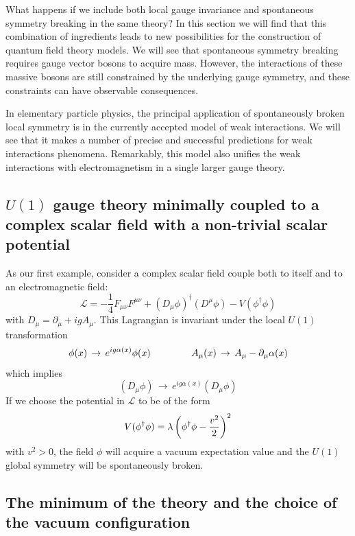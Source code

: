 \documentclass[TheoreticalPhy_ModB.tex]{subfiles}
\begin{document}
What happens if we include both local gauge invariance and spontaneous symmetry breaking in the same theory? In this section we will find that this combination of ingredients leads to new possibilities for the construction of quantum field theory models. We will see that spontaneous symmetry breaking requires gauge vector bosons to acquire mass. However, the interactions of these massive bosons are still constrained by the underlying gauge symmetry, and these constraints can have observable consequences. 

In elementary particle physics, the principal application of spontaneously broken local symmetry is in the currently accepted model of weak interactions. We will see that it makes a number of precise and successful predictions for weak interactions phenomena. Remarkably, this model also unifies the weak interactions with electromagnetism in a single larger gauge theory. 

\subsection{$U(1)$ gauge theory minimally coupled to a complex scalar field with a non-trivial scalar potential}

As our first example, consider a complex scalar field couple both to itself and to an electromagnetic field:
\[\mathcal L=-\frac14F_{\mu\nu}F^{\mu\nu}+(D_\mu\phi)^\dagger(D^\mu\phi)-V(\phi^\dagger\phi)\]
with $D_\mu=\partial_\mu+igA_\mu$. This Lagrangian is invariant under the local $U(1)$ transformation
\[\phi(x)\,\to\,e^{ig\alpha(x)}\phi(x)\hspace{1.5cm}A_\mu(x)\,\to\,A_{\mu}-\partial_\mu\alpha(x)\]
which implies
\[(D_\mu\phi)\,\to\,e^{ig\alpha(x)}(D_\mu\phi)\]
If we choose the potential in $\mathcal L$ to be of the form
\[V(\phi^\dagger\phi)=\lambda\left(\phi^\dagger\phi-\frac{v^2}2\right)^2\]
with $v^2>0$, the field $\phi$ will acquire a vacuum expectation value and the $U(1)$ global symmetry will be spontaneously broken. 

\subsection{The minimum of the theory and the choice of the vacuum configuration}
\end{document}
